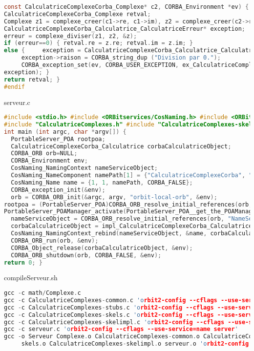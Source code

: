 \documentclass{article}
\begin{document}
\begin{lstlisting}[language=c]
const CalculatriceComplexeCorba_Complexe* c2, CORBA_Environment *ev) {
CalculatriceComplexeCorba_Complexe retval;
Complexe z1 = complexe_creer(c1->re, c1->im), z2 = complexe_creer(c2->re, c2->im), z; int erreur;
CalculatriceComplexeCorba_Calculatrice_CalculatriceErreur* exception;
erreur = complexe_diviser(z1, z2, &z);
if (erreur==0) { retval.re = z.re; retval.im = z.im; }
else {     exception = CalculatriceComplexeCorba_Calculatrice_CalculatriceErreur__alloc();
     exception->raison = CORBA_string_dup ("Division par 0.");
     CORBA_exception_set(ev, CORBA_USER_EXCEPTION, ex_CalculatriceComplexeCorba_Calculatrice_CalculatriceErreur,
exception); }
return retval; }
#endif
\end{lstlisting}


\vspace{-1ex}
serveur.c
\vspace{-1.5ex}
\begin{lstlisting}[language=c]
#include <stdio.h> #include <ORBitservices/CosNaming.h> #include <ORBitservices/CosNaming_impl.h>
#include "CalculatriceComplexes.h" #include "CalculatriceComplexes-skelimpl.c"
int main (int argc, char *argv[]) {
  PortableServer_POA rootpoa;
  CalculatriceComplexeCorba_Calculatrice corbaCalculatriceObject;
  CORBA_ORB orb=NULL;
  CORBA_Environment env;
  CosNaming_NamingContext nameServiceObject;
  CosNaming_NameComponent namePath[1] = {"CalculatriceComplexeCorba", ""};
  CosNaming_Name name = {1, 1, namePath, CORBA_FALSE};
  CORBA_exception_init(&env);
  orb = CORBA_ORB_init(&argc, argv, "orbit-local-orb", &env);
rootpoa = (PortableServer_POA)CORBA_ORB_resolve_initial_references(orb, "RootPOA", &env);
PortableServer_POAManager_activate(PortableServer_POA__get_the_POAManager(rootpoa, &env), &env);
  nameServiceObject = CORBA_ORB_resolve_initial_references(orb, "NameService", &env);
  corbaCalculatriceObject = impl_CalculatriceComplexeCorba_Calculatrice__create(rootpoa,&env);
  CosNaming_NamingContext_rebind(nameServiceObject, &name, corbaCalculatriceObject, &env);
  CORBA_ORB_run(orb, &env);
  CORBA_Object_release(corbaCalculatriceObject, &env);
  CORBA_ORB_shutdown(orb, CORBA_FALSE, &env);
return 0; }
\end{lstlisting}


\vspace{-1ex}
compileServeur.sh
\vspace{-1.5ex}
\begin{lstlisting}[language=c]
gcc -c math/Complexe.c
gcc -c CalculatriceComplexes-common.c 'orbit2-config --cflags --use-service=name server'
gcc -c CalculatriceComplexes-stubs.c 'orbit2-config --cflags --use-service=name server'
gcc -c CalculatriceComplexes-skels.c 'orbit2-config --cflags --use-service=name server'
gcc -c CalculatriceComplexes-skelimpl.c 'orbit2-config --cflags --use-service=name server'
gcc -c serveur.c 'orbit2-config --cflags --use-service=name server'
gcc -o Serveur Complexe.o CalculatriceComplexes-common.o CalculatriceComplexes-stubs.o CalculatriceComplexes-
     skels.o CalculatriceComplexes-skelimpl.o serveur.o 'orbit2-config --libs --use-service=name server'
\end{lstlisting}
\end{document}
